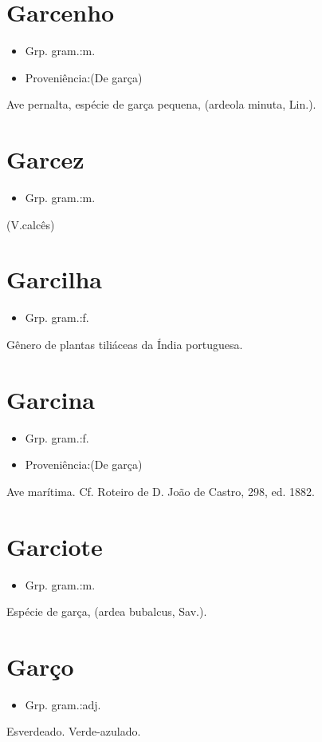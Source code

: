 \section{Garcenho}
\begin{itemize}
\item {Grp. gram.:m.}
\end{itemize}
\begin{itemize}
\item {Proveniência:(De \textunderscore garça\textunderscore )}
\end{itemize}
Ave pernalta, espécie de garça pequena, (\textunderscore ardeola minuta\textunderscore , Lin.).
\section{Garcez}
\begin{itemize}
\item {Grp. gram.:m.}
\end{itemize}
(V.calcês)
\section{Garcilha}
\begin{itemize}
\item {Grp. gram.:f.}
\end{itemize}
Gênero de plantas tiliáceas da Índia portuguesa.
\section{Garcina}
\begin{itemize}
\item {Grp. gram.:f.}
\end{itemize}
\begin{itemize}
\item {Proveniência:(De \textunderscore garça\textunderscore )}
\end{itemize}
Ave marítima. Cf. \textunderscore Roteiro de D. João de Castro\textunderscore , 298, ed. 1882.
\section{Garciote}
\begin{itemize}
\item {Grp. gram.:m.}
\end{itemize}
Espécie de garça, (\textunderscore ardea bubalcus\textunderscore , Sav.).
\section{Garço}
\begin{itemize}
\item {Grp. gram.:adj.}
\end{itemize}
Esverdeado.
Verde-azulado.

